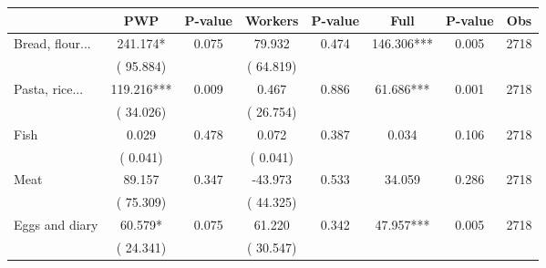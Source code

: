 
\begin{tabular}{l*{7}{c}}\hline&\multicolumn{1}{c}{PWP}&\multicolumn{1}{c}{P-value}&\multicolumn{1}{c}{Workers}&\multicolumn{1}{c}{P-value}&\multicolumn{1}{c}{Full}&\multicolumn{1}{c}{P-value}&\multicolumn{1}{c}{Obs} \\ \hline

 Bread, flour...       &            241.174*       &        0.075  &             79.932       &        0.474  &            146.306***       &              0.005 &  2718 \\ 
                       &       (      95.884)             &                               &       (      64.819)                     &                               &                                               &                                &                      \\ 

 Pasta, rice...       &            119.216***       &        0.009  &              0.467       &        0.886  &             61.686***       &              0.001 &  2718 \\ 
                       &       (      34.026)             &                               &       (      26.754)                     &                               &                                               &                                &                      \\ 

 Fish       &              0.029       &        0.478  &              0.072       &        0.387  &              0.034       &              0.106 &  2718 \\ 
                       &       (       0.041)             &                               &       (       0.041)                     &                               &                                               &                                &                      \\ 

 Meat       &             89.157       &        0.347  &            -43.973       &        0.533  &             34.059       &              0.286 &  2718 \\ 
                       &       (      75.309)             &                               &       (      44.325)                     &                               &                                               &                                &                      \\ 

 Eggs and diary       &             60.579*       &        0.075  &             61.220       &        0.342  &             47.957***       &              0.005 &  2718 \\ 
                       &       (      24.341)             &                               &       (      30.547)                     &                               &                                               &                                &                      \\ 


\end{tabular}
